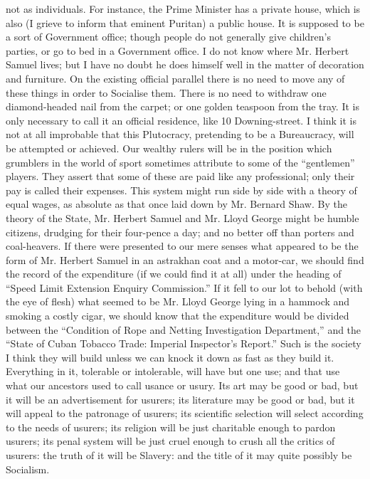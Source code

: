 \documentclass{book}
\begin{document}
not as individuals. For instance, the Prime Minister has a private house, which is also (I grieve to inform that eminent Puritan) a public house. It is supposed to be a sort of Government office; though people do not generally give children’s parties, or go to bed in a Government office. I do not know where Mr. Herbert Samuel lives; but I have no doubt he does himself well in the matter of decoration and furniture. On the existing official parallel there is no need to move any of these things in order to Socialise them. There is no need to withdraw one diamond-headed nail from the carpet; or one golden teaspoon from the tray. It is only necessary to call it an official residence, like 10 Downing-street. I think it is not at all improbable that this Plutocracy, pretending to be a Bureaucracy, will be attempted or achieved. Our wealthy rulers will be in the position which grumblers in the world of sport sometimes attribute to some of the “gentlemen” players. They assert that some of these are paid like any professional; only their pay is called their expenses. This system might run side by side with a theory of equal wages, as absolute as that once laid down by Mr. Bernard Shaw. By the theory of the State, Mr. Herbert Samuel and Mr. Lloyd George might be humble citizens, drudging for their four-pence a day; and no better off than porters and coal-heavers. If there were presented to our mere senses what appeared to be the form of Mr. Herbert Samuel in an astrakhan coat and a motor-car, we should find the record of the expenditure (if we could find it at all) under the heading of “Speed Limit Extension Enquiry Commission.” If it fell to our lot to behold (with the eye of flesh) what seemed to be Mr. Lloyd George lying in a hammock and smoking a costly cigar, we should know that the expenditure would be divided between the “Condition of Rope and Netting Investigation Department,” and the “State of Cuban Tobacco Trade: Imperial Inspector’s Report.” Such is the society I think they will build unless we can knock it down as fast as they build it. Everything in it, tolerable or intolerable, will have but one use; and that use what our ancestors used to call usance or usury. Its art may be good or bad, but it will be an advertisement for usurers; its literature may be good or bad, but it will appeal to the patronage of usurers; its scientific selection will select according to the needs of usurers; its religion will be just charitable enough to pardon usurers; its penal system will be just cruel enough to crush all the critics of usurers: the truth of it will be Slavery: and the title of it may quite possibly be Socialism.
\end{document}
